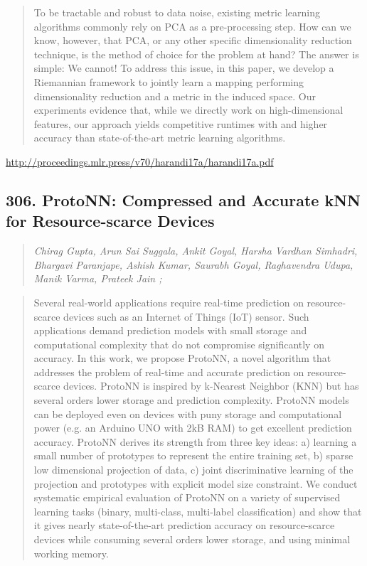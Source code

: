 \documentclass{article}
\begin{document}
\begin{quote}
    To be tractable and robust to data noise, existing metric learning algorithms commonly rely on PCA as a pre-processing step. How can we know, however, that PCA, or any other specific dimensionality reduction technique, is the method of choice for the problem at hand? The answer is simple: We cannot! To address this issue, in this paper, we develop a Riemannian framework to jointly learn a mapping performing dimensionality reduction and a metric in the induced space. Our experiments evidence that, while we directly work on high-dimensional features, our approach yields competitive runtimes with and higher accuracy than state-of-the-art metric learning algorithms.  \end{quote}

\href{http://proceedings.mlr.press/v70/harandi17a/harandi17a.pdf}{http://proceedings.mlr.press/v70/harandi17a/harandi17a.pdf}

\subsection{306. ProtoNN: Compressed and Accurate kNN for Resource-scarce Devices}

\begin{quote}
\footnotesize{\textit{Chirag Gupta, Arun Sai Suggala, Ankit Goyal, Harsha Vardhan Simhadri, Bhargavi Paranjape, Ashish Kumar, Saurabh Goyal, Raghavendra Udupa, Manik Varma, Prateek Jain ;}}
\end{quote}

\begin{quote}
    Several real-world applications require real-time prediction on resource-scarce devices such as an Internet of Things (IoT) sensor. Such applications demand prediction models with small storage and computational complexity that do not compromise significantly on accuracy. In this work, we propose ProtoNN, a novel algorithm that addresses the problem of real-time and accurate prediction on resource-scarce devices. ProtoNN is inspired by k-Nearest Neighbor (KNN) but has several orders lower storage and prediction complexity. ProtoNN models can be deployed even on devices with puny storage and computational power (e.g. an Arduino UNO with 2kB RAM) to get excellent prediction accuracy. ProtoNN derives its strength from three key ideas: a) learning a small number of prototypes to represent the entire training set, b) sparse low dimensional projection of data, c) joint discriminative learning of the projection and prototypes with explicit model size constraint. We conduct systematic empirical evaluation of ProtoNN on a variety of supervised learning tasks (binary, multi-class, multi-label classification) and show that it gives nearly state-of-the-art prediction accuracy on resource-scarce devices while consuming several orders lower storage, and using minimal working memory.  \end{quote}
\end{document}
